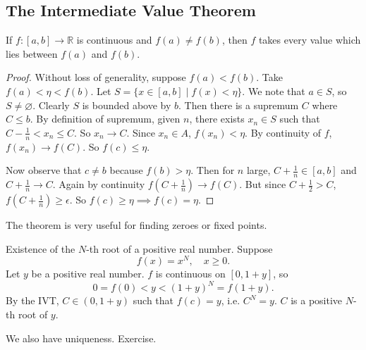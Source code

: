 \subsection{The Intermediate Value Theorem}
\leavevmode
\begin{theorem}
    If \(f: [a,b]\to\mathbb{R}\) is continuous and \(f(a) \neq f(b)\), then \(f\) takes every value which lies between \(f(a)\) and \(f(b)\).
\end{theorem}
\begin{proof}
    Without loss of generality, suppose \(f(a) < f(b)\). Take \(f(a) < \eta < f(b)\). Let \(S = \{x \in [a,b]\mid f(x) < \eta\}\). We note that \(a \in S\), so \(S\neq \varnothing \). Clearly \(S\) is bounded above by \(b\). Then there is a supremum \(C\) where \(C \leq b\). By definition of supremum, given \(n\), there exists \(x_n \in S\) such that \(C - \frac{1}{n} < x_n \leq C\). So \(x_n \to C\). Since \(x_n \in A\), \(f(x_n) < \eta\). By continuity of \(f\), \(f(x_n) \to f(C)\). So \(f(c) \leq \eta\).
    
    Now observe that \(c \neq b\) because \(f(b) > \eta\). Then for \(n\) large, \(C + \frac{1}{n} \in [a,b]\) and \(C+\frac{1}{n}\to C\). Again by continuity \(f(C + \frac{1}{n})\to f(C)\). But since \(C + \frac{1}{2} > C\), \(f(C + \frac{1}{n})\geq \epsilon\). So \(f(c) \geq \eta \implies f(c) = \eta\).
\end{proof}
\begin{remark}
    The theorem is very useful for finding zeroes or fixed points.
\end{remark}
\begin{example}
    Existence of the \(N\)-th root of a positive real number. Suppose
    \[
        f(x) = x^N, \quad x\geq 0.
    \]
    Let \(y\) be a positive real number. \(f\) is continuous on \([0, 1 + y]\), so
    \[
        0 = f(0) < y < (1 + y)^N = f(1 + y).
    \]
    By the IVT, \(C \in (0, 1 + y)\) such that \(f(c) = y\), i.e. \(C^N = y\). \(C\) is a positive \(N\)-th root of \(y\).

    We also have uniqueness. Exercise.
\end{example}